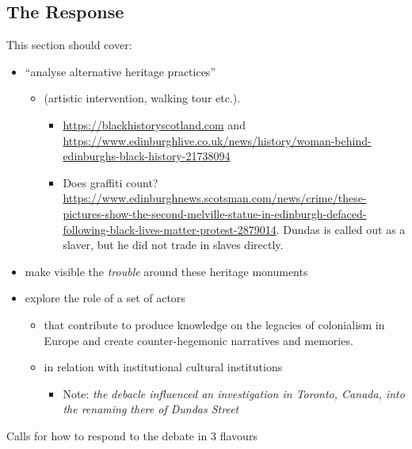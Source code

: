 \documentclass{scrartcl}
\begin{document}
\subsection{The Response}

This section should cover:

\begin{itemize}
    \item ``analyse alternative heritage practices''
    \begin{itemize}
        \item  (artistic intervention, walking tour etc.).
        \begin{itemize}
            \item \url{https://blackhistoryscotland.com} and \url{https://www.edinburghlive.co.uk/news/history/woman-behind-edinburghs-black-history-21738094}
        \end{itemize}
        \begin{itemize}
            \item Does graffiti count? \url{https://www.edinburghnews.scotsman.com/news/crime/these-pictures-show-the-second-melville-statue-in-edinburgh-defaced-following-black-lives-matter-protest-2879014}. Dundas is called out as a slaver, but he did not trade in slaves directly.
        \end{itemize}
    \end{itemize}
    \item make visible the \textit{trouble} around these heritage monuments
    \item explore the role of a set of actors
    \begin{itemize}
        \item that contribute to produce knowledge on the legacies of colonialism in Europe and create counter-hegemonic narratives and memories.
        \item in relation with institutional cultural institutions
        \begin{itemize}
            \item Note: \textit{the debacle influenced an investigation in Toronto, Canada, into the renaming there of Dundas Street} \cite{mccarthy_2022}
        \end{itemize}
    \end{itemize}
\end{itemize}

Calls for how to respond to the debate in 3 flavours
\end{document}
